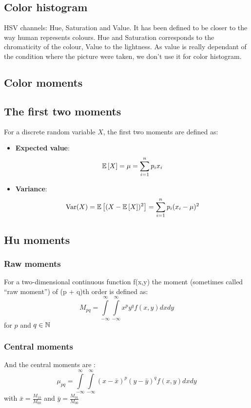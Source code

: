\subsection{Color histogram}

HSV channels: Hue, Saturation and Value.
It has been defined to be closer to the way human represents colours.
Hue and Saturation corresponds to the chromaticity of the colour, Value to the lightness.
As value is really dependant of the condition where the picture were taken, we don't use it for color histogram.

\subsection{Color moments}

\subsection{The first two moments}

For a discrete random variable $X$, the first two moments are defined as:
\begin{itemize}
    \item \textbf{Expected value}: $$\mathbb{E} \left[ X \right] = \mu = \sum_{i = 1}^{n} p_i x_i $$
    \item \textbf{Variance}:  $$ \operatorname{Var} (X)= \mathbb{E} \left[ (X - \mathbb{E} \left[ X \right] )^2 \right] =\sum _{i=1}^{n} p_i (x_{i} - \mu )^{2} $$
\end{itemize}

\subsection{Hu moments}

\subsubsection{Raw moments}

For a two-dimensional continuous function f(x,y) the moment (sometimes called \enquote{raw moment}) of (p + q)th order is defined as: 
$$M_{pq}=\int \limits _{-\infty }^{\infty }\int \limits _{-\infty }^{\infty }x^{p}y^{q}f(x,y) dx dy $$
for $p$ and $q \in \mathbb{N} $

\subsubsection{Central moments}

And the central moments are :
$$\mu_{pq}=\int \limits_{-\infty }^{\infty }\int \limits _{-\infty}^{\infty} (x- \bar{x})^{p}(y - \bar{y})^{q} f(x,y) dx dy $$
with $\bar{x}=\frac{M_{10}}{M_{00}}$ and $\bar{y}=\frac{M_{01}}{M_{00}}$

